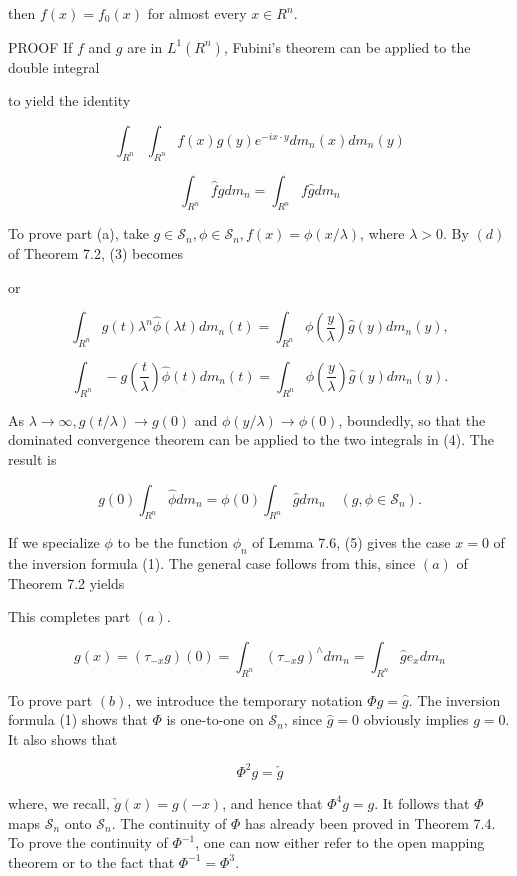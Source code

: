 \documentclass[10pt]{article}
\begin{document}
then $f(x)=f_{0}(x)$ for almost every $x \in R^{n}$.

PROOF If $f$ and $g$ are in $L^{1}\left(R^{n}\right)$, Fubini's theorem can be applied to the double integral

to yield the identity

$$
\int_{R^{n}} \int_{R^{n}} f(x) g(y) e^{-i x \cdot y} d m_{n}(x) d m_{n}(y)
$$

$$
\int_{R^{n}} \hat{f} g d m_{n}=\int_{R^{n}} f \hat{g} d m_{n}
$$

To prove part (a), take $g \in \mathscr{S}_{n}, \phi \in \mathscr{S}_{n}, f(x)=\phi(x / \lambda)$, where $\lambda>0$. By $(d)$ of Theorem 7.2, (3) becomes

or

$$
\int_{R^{n}} g(t) \lambda^{n} \hat{\phi}(\lambda t) d m_{n}(t)=\int_{R^{n}} \phi\left(\frac{y}{\lambda}\right) \hat{g}(y) d m_{n}(y),
$$

$$
\int_{R^{n}}-g\left(\frac{t}{\lambda}\right) \hat{\phi}(t) d m_{n}(t)=\int_{R^{n}} \phi\left(\frac{y}{\lambda}\right) \hat{g}(y) d m_{n}(y) .
$$

As $\lambda \rightarrow \infty, g(t / \lambda) \rightarrow g(0)$ and $\phi(y / \lambda) \rightarrow \phi(0)$, boundedly, so that the dominated convergence theorem can be applied to the two integrals in (4). The result is

$$
g(0) \int_{R^{n}} \hat{\phi} d m_{n}=\phi(0) \int_{R^{n}} \hat{g} d m_{n} \quad\left(g, \phi \in \mathscr{S}_{n}\right) .
$$

If we specialize $\phi$ to be the function $\phi_{n}$ of Lemma 7.6, (5) gives the case $x=0$ of the inversion formula (1). The general case follows from this, since $(a)$ of
Theorem 7.2 yields

This completes part $(a)$.

$$
g(x)=\left(\tau_{-x} g\right)(0)=\int_{R^{n}}\left(\tau_{-x} g\right)^{\wedge} d m_{n}=\int_{R^{n}} \hat{g} e_{x} d m_{n}
$$

To prove part $(b)$, we introduce the temporary notation $\Phi g=\hat{g}$. The inversion formula (1) shows that $\Phi$ is one-to-one on $\mathscr{S}_{n}$, since $\hat{g}=0$ obviously implies $g=0$. It also shows that

$$
\Phi^{2} g=\check{g}
$$

where, we recall, $\check{g}(x)=g(-x)$, and hence that $\Phi^{4} g=g$. It follows that $\Phi$ maps $\mathscr{S}_{n}$ onto $\mathscr{S}_{n}$. The continuity of $\Phi$ has already been proved in Theorem 7.4. To prove the continuity of $\Phi^{-1}$, one can now either refer to the open mapping theorem or to the fact that $\Phi^{-1}=\Phi^{3}$.
\end{document}
